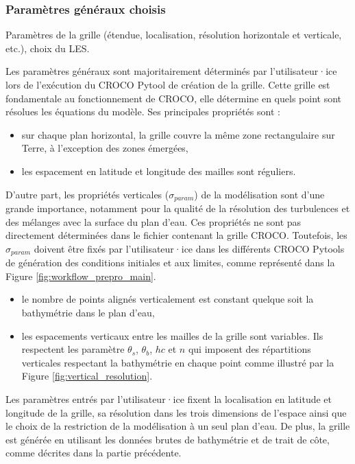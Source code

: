 \documentclass[10pt,a4paper,titlepage]{article}
\begin{document}
\subsubsection{Paramètres généraux choisis}
\label{subsub:param_generaux}
{\color{lightgrey}
    Paramètres de la grille (étendue, localisation, résolution horizontale et verticale, etc.), choix du LES.
}

Les paramètres généraux sont majoritairement déterminés par l'utilisateur·ice lors de l'exécution du CROCO Pytool de création de la grille.
Cette grille est fondamentale au fonctionnement de CROCO, elle détermine en quels point sont résolues les équations du modèle. Ses principales propriétés sont :

\begin{itemize}
    \item sur chaque plan horizontal, la grille couvre la même zone rectangulaire sur Terre, à l'exception des zones émergées,
    \item les espacement en latitude et longitude des mailles sont réguliers.
\end{itemize}

D'autre part, les propriétés verticales ($\sigma_{param}$) de la modélisation sont d'une grande importance, notamment pour la qualité de la résolution des turbulences et des mélanges avec la surface du plan d'eau.
Ces propriétés ne sont pas directement déterminées dans le fichier contenant la grille CROCO.
Toutefois, les $\sigma_{param}$ doivent être fixés par l'utilisateur·ice dans les différents CROCO Pytools de génération des conditions initiales et aux limites, comme représenté dans la Figure \ref{fig:workflow_prepro_main}.

\begin{itemize}
    \item le nombre de points alignés verticalement est constant quelque soit la bathymétrie dans le plan d'eau,
    \item les espacements verticaux entre les mailles de la grille sont variables. Ils respectent les paramètre $\theta_s$, $\theta_b$, $hc$ et $n$ qui imposent des répartitions verticales respectant la bathymétrie en chaque point comme illustré par la Figure \ref{fig:vertical_resolution}.
\end{itemize}


Les paramètres entrés par l'utilisateur·ice fixent la localisation en latitude et longitude de la grille, sa résolution dans les trois dimensions de l'espace ainsi que le choix de la restriction de la modélisation à un seul plan d'eau.
De plus, la grille est générée en utilisant les données brutes de bathymétrie et de trait de côte, comme décrites dans la partie précédente.
\end{document}
